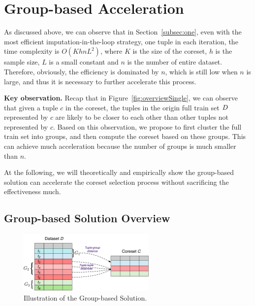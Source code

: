 

\section{Group-based Acceleration}

As discussed above, we can observe that in Section~\ref{subsec:one}, even with the most efficient imputation-in-the-loop  strategy, \ie  one tuple in  each iteration, the time complexity is  $O(KhnL^2)$, where $K$ is the size of the coreset, $h$ is the sample size, $L$ is a small constant and $n$ is the number of entire dataset. Therefore, obviously, the efficiency is dominated by $n$, which is still low when $n$ is large, and thus it  is necessary to further accelerate this process.

\noindent \textbf{Key observation.}   Recap that in Figure~\ref{fig:overviewSingle}, we can observe that  given a tuple $c$ in the coreset, the tuples in the origin full train set $D$ represented by $c$ are likely to be  closer to each other than other tuples not represented by $c$.
Based on this observation, we propose to first cluster the full train set into groups, and then compute the coreset based on these groups. This can achieve much acceleration because the number of groups is much smaller than $n$. 

At the following, we will theoretically and empirically show the group-based solution can accelerate the coreset selection process without sacrificing the effectiveness much.


\subsection{Group-based Solution Overview}

\begin{figure}[t]
    \centering
    \includegraphics[width=0.6\textwidth]{figs/Overview-gb}
    \caption{Illustration of the Group-based Solution.}
    \label{fig:overview-gb}
\end{figure}

